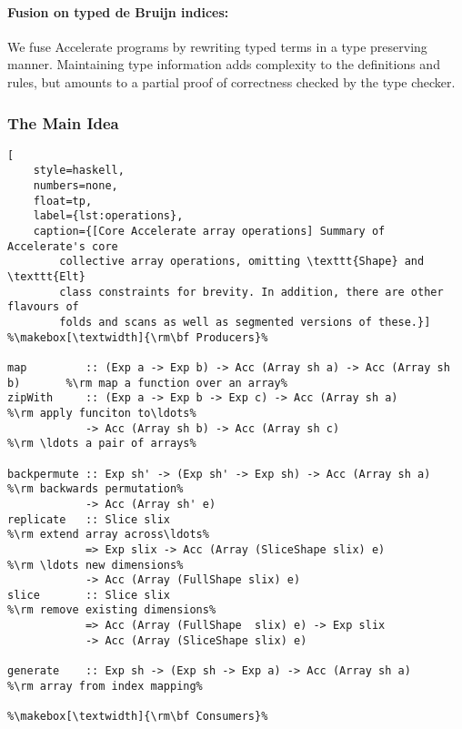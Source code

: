 \paragraph{Fusion on typed de Bruijn indices:} We fuse Accelerate programs by
rewriting typed  terms in a type preserving manner.
Maintaining type information adds complexity to the definitions and rules, but
amounts to a partial proof of correctness checked by the type checker.


\subsubsection{The Main Idea}

\begin{lstlisting}[
    style=haskell,
    numbers=none,
    float=tp,
    label={lst:operations},
    caption={[Core Accelerate array operations] Summary of Accelerate's core
        collective array operations, omitting \texttt{Shape} and \texttt{Elt}
        class constraints for brevity. In addition, there are other flavours of
        folds and scans as well as segmented versions of these.}]
%\makebox[\textwidth]{\rm\bf Producers}%

map         :: (Exp a -> Exp b) -> Acc (Array sh a) -> Acc (Array sh b)       %\rm map a function over an array%
zipWith     :: (Exp a -> Exp b -> Exp c) -> Acc (Array sh a)                  %\rm apply funciton to\ldots%
            -> Acc (Array sh b) -> Acc (Array sh c)                           %\rm \ldots a pair of arrays%

backpermute :: Exp sh' -> (Exp sh' -> Exp sh) -> Acc (Array sh a)             %\rm backwards permutation%
            -> Acc (Array sh' e)
replicate   :: Slice slix                                                     %\rm extend array across\ldots%
            => Exp slix -> Acc (Array (SliceShape slix) e)                    %\rm \ldots new dimensions%
            -> Acc (Array (FullShape slix) e)
slice       :: Slice slix                                                     %\rm remove existing dimensions%
            => Acc (Array (FullShape  slix) e) -> Exp slix
            -> Acc (Array (SliceShape slix) e)

generate    :: Exp sh -> (Exp sh -> Exp a) -> Acc (Array sh a)                %\rm array from index mapping%

%\makebox[\textwidth]{\rm\bf Consumers}%


\end{lstlisting}
